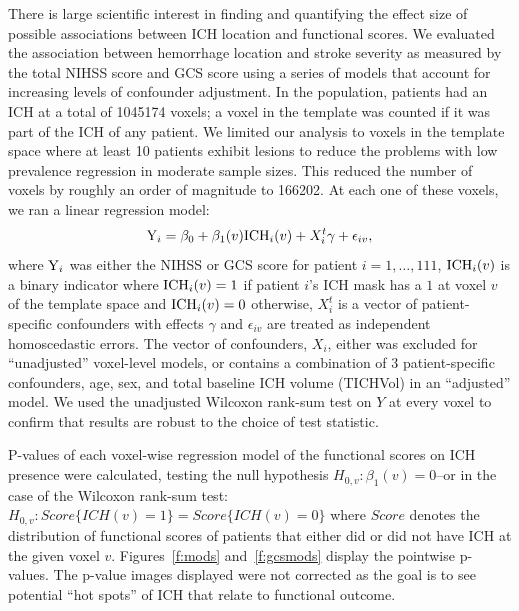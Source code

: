 \documentclass[10pt]{article}\usepackage[]{graphicx}\usepackage[]{color}
\begin{document}
There is large scientific interest in finding and quantifying the effect size of possible associations between ICH location and functional scores.  We evaluated the association between hemorrhage location and stroke severity as measured by the total NIHSS score and GCS score using a series of models that account for increasing levels of confounder adjustment.  In the population, patients had an ICH at a total of 1045174 voxels; a voxel in the template was counted if it was part of the ICH of any patient.  We limited our analysis to voxels in the template space where at least 10 patients exhibit lesions to reduce the problems with low prevalence regression in moderate sample sizes.
This reduced the number of voxels by roughly an order of magnitude to 166202. At each one of these voxels, we ran a linear regression model:
\begin{equation}\label{eq:nihss_regression}
{\rm Y}_i=\beta_0+\beta_1(v) {\rm ICH}_i(v)+X^t_i \gamma + \epsilon_{iv}, 
\end{equation}
where ${\rm Y}_i$ was either the NIHSS or GCS score for patient $i=1,\ldots,111$, ${\rm ICH}_i(v)$ is a binary indicator where ${\rm ICH}_i(v) = 1$ if patient $i$'s ICH mask has a $1$ at voxel $v$ of the template space and ${\rm ICH}_i(v) = 0$ otherwise, $X^t_i$ is a vector of patient-specific confounders with effects $\gamma$ and $\epsilon_{iv}$ are treated as independent homoscedastic errors.  The vector of confounders, $X_i$, either was excluded for ``unadjusted'' voxel-level models, or contains a combination of $3$ patient-specific confounders, age, sex, and total baseline ICH volume (TICHVol) in an ``adjusted'' model.  We used the unadjusted Wilcoxon rank-sum test on $Y$ at every voxel to confirm that results are robust to the choice of test statistic.


P-values of each voxel-wise regression model of the functional scores on ICH presence were calculated, testing the null hypothesis $H_{0,v}:\beta_1(v)=0$--or in the case of the Wilcoxon rank-sum test: $H_{0,v}: Score\{ICH(v) = 1\} = Score\{ICH(v) = 0\}$ where $Score$ denotes the distribution of functional scores of patients that either did or did not have ICH at the given voxel $v$.  Figures~\ref{f:mods} and~\ref{f:gcsmods} display the pointwise p-values.  The p-value images displayed were not corrected as the goal is to see potential ``hot spots'' of ICH that relate to functional outcome.
\end{document}

